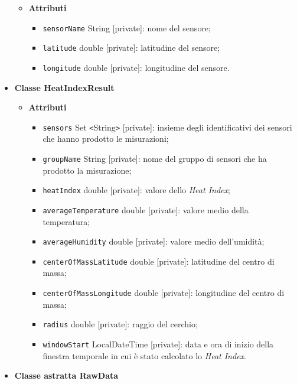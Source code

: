 \begin{itemize}
	      \begin{itemize}
		      \item \textbf{Attributi}
		            \begin{itemize}
			            \item \texttt{sensorName} String [private]: nome del sensore;
			            \item \texttt{latitude} double [private]: latitudine del sensore;
			            \item \texttt{longitude} double [private]: longitudine del sensore.
		            \end{itemize}
	      \end{itemize}
	\item \textbf{Classe HeatIndexResult}
	      \begin{itemize}
		      \item \textbf{Attributi}
		            \begin{itemize}
			            \item \texttt{sensors} Set \texttt{<}String\texttt{>} [private]: insieme degli identificativi dei sensori che hanno prodotto le misurazioni;
			            \item \texttt{groupName} String [private]: nome del gruppo di sensori che ha prodotto la misurazione;
			            \item \texttt{heatIndex} double [private]: valore dello \textit{Heat Index};
			            \item \texttt{averageTemperature} double [private]: valore medio della temperatura;
			            \item \texttt{averageHumidity} double [private]: valore medio dell'umidità;
			            \item \texttt{centerOfMassLatitude} double [private]: latitudine del centro di massa;
			            \item  \texttt{centerOfMassLongitude} double [private]: longitudine del centro di massa;
			            \item  \texttt{radius} double [private]: raggio del cerchio;
			            \item  \texttt{windowStart} LocalDateTime [private]: data e ora di inizio della finestra temporale in cui è stato calcolato lo \textit{Heat Index}.
		            \end{itemize}
	      \end{itemize}
	\item \textbf{Classe astratta RawData}\label{abstract_class_raw_data}
	      \begin{itemize}

\end{itemize}
\end{itemize}
